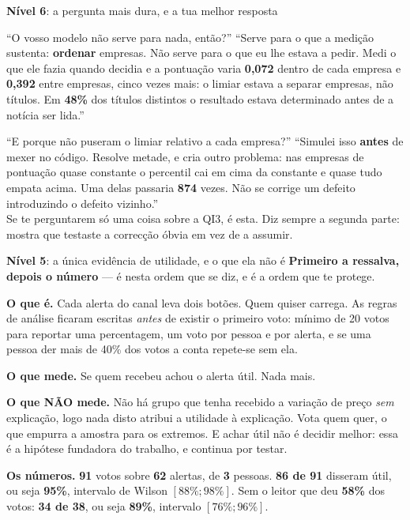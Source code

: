 \documentclass[aspectratio=169]{beamer}
\newcommand{\key}[1]{\textbf{\textcolor{blue!55!black}{#1}}}
\begin{document}
\begin{frame}{\key{Nível 6}: a pergunta mais dura, e a tua melhor resposta}
\small
\begin{block}{``O vosso modelo não serve para nada, então?''}
``Serve para o que a medição sustenta: \textbf{ordenar} empresas. Não serve para o que eu lhe
estava a pedir. Medi o que ele fazia quando decidia e a pontuação varia \key{0{,}072} dentro de cada
empresa e \key{0{,}392} entre empresas, cinco vezes mais: o limiar estava a separar empresas,
não títulos. Em \key{48\%} dos títulos distintos o resultado estava determinado antes de a
notícia ser lida.''
\end{block}
\begin{block}{``E porque não puseram o limiar relativo a cada empresa?''}
``Simulei isso \textbf{antes} de mexer no código. Resolve metade, e cria outro problema: nas
empresas de pontuação quase constante o percentil cai em cima da constante e quase tudo empata
acima. Uma delas passaria \key{874} vezes. Não se corrige um defeito introduzindo o defeito
vizinho.''\\
\footnotesize \textcolor{red!60!black}{Se te perguntarem só uma coisa sobre a QI3, é esta. Diz
sempre a segunda parte: mostra que testaste a correcção óbvia em vez de a assumir.}
\end{block}
\end{frame}

\begin{frame}{\key{Nível 5}: a única evidência de utilidade, e o que ela não é}
\textbf{Primeiro a ressalva, depois o número} --- é nesta ordem que se diz, e é a ordem que te
protege.

\medskip
\textbf{O que é.} Cada alerta do canal leva dois botões. Quem quiser carrega. As regras de
análise ficaram escritas \emph{antes} de existir o primeiro voto: mínimo de 20 votos para
reportar uma percentagem, um voto por pessoa e por alerta, e se uma pessoa der mais de 40\% dos
votos a conta repete-se sem ela.

\medskip
\textbf{O que mede.} Se quem recebeu achou o alerta útil. Nada mais.

\medskip
\textbf{O que NÃO mede.} Não há grupo que tenha recebido a variação de preço \emph{sem}
explicação, logo nada disto atribui a utilidade à explicação. Vota quem quer, o que empurra a
amostra para os extremos. E achar útil não é decidir melhor: essa é a hipótese fundadora do
trabalho, e continua por testar.

\medskip
\textbf{Os números.} \key{91} votos sobre \key{62} alertas, de \key{3} pessoas. \key{86 de 91}
disseram útil, ou seja \key{95\%}, intervalo de Wilson $[88\%;98\%]$. Sem o leitor que deu
\key{58\%} dos votos: \key{34 de 38}, ou seja \key{89\%}, intervalo $[76\%;96\%]$.
\end{frame}
\end{document}
